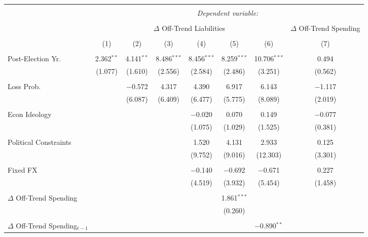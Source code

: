 
\begingroup 
\tiny 
\begin{tabular}{@{\extracolsep{5pt}}lccccccc} 
\\[-1.8ex]\hline 
\hline \\[-1.8ex] 
 & \multicolumn{7}{c}{\textit{Dependent variable:}} \\ 
\cline{2-8} 
\\[-1.8ex] & \multicolumn{6}{c}{$\Delta$ Off-Trend Liabilities} & $\Delta$ Off-Trend Spending \\ 
\\[-1.8ex] & (1) & (2) & (3) & (4) & (5) & (6) & (7)\\ 
\hline \\[-1.8ex] 
 Post-Election Yr. & 2.362$^{**}$ & 4.141$^{**}$ & 8.486$^{***}$ & 8.456$^{***}$ & 8.259$^{***}$ & 10.706$^{***}$ & 0.494 \\ 
  & (1.077) & (1.610) & (2.556) & (2.584) & (2.486) & (3.251) & (0.562) \\ 
  & & & & & & & \\ 
 Loss Prob. &  & $-$0.572 & 4.317 & 4.390 & 6.917 & 6.143 & $-$1.117 \\ 
  &  & (6.087) & (6.409) & (6.477) & (5.775) & (8.089) & (2.019) \\ 
  & & & & & & & \\ 
 Econ Ideology &  &  &  & $-$0.020 & 0.070 & 0.149 & $-$0.077 \\ 
  &  &  &  & (1.075) & (1.029) & (1.525) & (0.381) \\ 
  & & & & & & & \\ 
 Political Constraints &  &  &  & 1.520 & 4.131 & 2.933 & 0.125 \\ 
  &  &  &  & (9.752) & (9.016) & (12.303) & (3.301) \\ 
  & & & & & & & \\ 
 Fixed FX &  &  &  & $-$0.140 & $-$0.692 & $-$0.671 & 0.227 \\ 
  &  &  &  & (4.519) & (3.932) & (5.454) & (1.458) \\ 
  & & & & & & & \\ 
 $\Delta$ Off-Trend Spending &  &  &  &  & 1.861$^{***}$ &  &  \\ 
  &  &  &  &  & (0.260) &  &  \\ 
  & & & & & & & \\ 
 $\Delta$ Off-Trend Spending$_{t-1}$ &  &  &  &  &  & $-$0.890$^{**}$ &  \\ 

\end{tabular}
